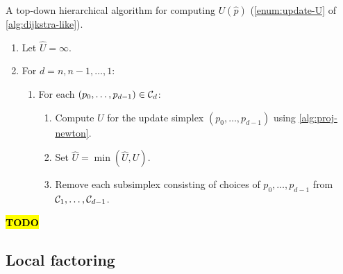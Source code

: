 \documentclass[eikonal.tex]{subfiles}
\begin{document}
\begin{algorithm}[H]
  \caption{A top-down hierarchical algorithm for computing
    $U(\hat{p})$ (\cref{enum:update-U} of
    \cref{alg:dijkstra-like}).}\label{alg:top-down}
  \begin{enumerate}[nolistsep]
  \item Let $\hat{U} = \infty$.
  \item For $d = n, n-1, \hdots, 1$:
    \begin{enumerate}
    \item For each $(p_0, \hdots, p_{d-1}) \in \mathcal{C}_d$:
      \begin{enumerate}
      \item Compute $U$ for the update simplex
        $(p_0, \hdots, p_{d-1})$ using \cref{alg:proj-newton}.
      \item Set $\hat{U} = \min(\hat{U}, U)$.
      \item Remove each subsimplex consisting of choices of
        $p_0, \hdots, p_{d-1}$ from $\mathcal{C}_1, \hdots, \mathcal{C}_{d-1}$.
      \end{enumerate}
    \end{enumerate}
  \end{enumerate}
\end{algorithm}

\hl{\textbf{TODO}}

\subsection{Local factoring}
\end{document}
